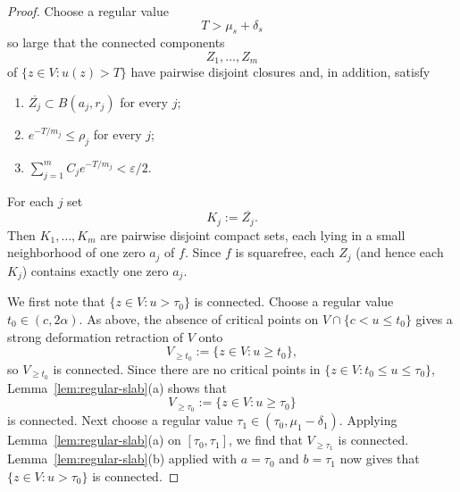 \documentclass[12pt]{amsart}
\theoremstyle{definition}
\theoremstyle{remark}
\begin{document}
\begin{proof}
Choose a regular value
\[
 T>\mu_s+\delta_s
\]
so large that the connected components
\[
 Z_1,\dots,Z_m
\]
of $\{z\in V:u(z)>T\}$ have pairwise disjoint closures and, in addition, satisfy
\begin{enumerate}
\item[(i)] $\overline{Z_j}\subset B(a_j,r_j)$ for every $j$;
\item[(ii)] $e^{-T/m_j}\le \rho_j$ for every $j$;
\item[(iii)] $\sum_{j=1}^m C_j e^{-T/m_j}<\varepsilon/2$.
\end{enumerate}

For each $j$ set
\[
K_j:=\overline{Z_j}.
\]
Then $K_1,\dots,K_m$ are pairwise disjoint compact sets, each lying in a small neighborhood of one zero
$a_j$ of $f$. Since $f$ is squarefree, each $Z_j$ (and hence each $K_j$) contains exactly one zero $a_j$.

\indent We first note that $\{z\in V:u>\tau_0\}$ is connected. Choose a regular value $t_0\in(c,2\alpha)$. As above,
the absence of critical points on $V\cap\{c<u\le t_0\}$ gives a strong deformation retraction of $V$ onto
\[
V_{\ge t_0}:=\{z\in V:u\ge t_0\},
\]
so $V_{\ge t_0}$ is connected. Since there are no critical points in $\{z\in V:t_0\le u\le \tau_0\}$, Lemma~\ref{lem:regular-slab}(a) shows
that
\[
V_{\ge \tau_0}:=\{z\in V:u\ge \tau_0\}
\]
is connected. Next choose a regular value $\tau_1\in(\tau_0,\mu_1-\delta_1)$. Applying Lemma~\ref{lem:regular-slab}(a) on $[\tau_0,\tau_1]$,
we find that $V_{\ge \tau_1}$ is connected. Lemma~\ref{lem:regular-slab}(b) applied with $a=\tau_0$ and $b=\tau_1$ now gives that
$\{z\in V:u>\tau_0\}$ is connected.


\end{proof}
\end{document}
